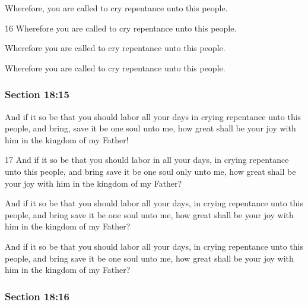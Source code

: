 		Wherefore, you are called to cry repentance unto this people.

		\begin{framed}
		\scriptsize
			\begin{compactdesc}
				\item[JSP] 16 Wherefore you are called to cry repentance unto this people.
				\item[DC 1835] Wherefore you are called to cry repentance unto this people. 
				\item[DC 1844] Wherefore you are called to cry repentance unto this people. 
			\end{compactdesc}
		\end{framed}

	\subsubsection{Section 18:15} %
		\label{DC18-15}

		And if it so be that you should labor all your days in crying repentance unto this people, and bring, save it be one soul unto me, how great shall be your joy with him in the kingdom of my Father!

		\begin{framed}
		\scriptsize
			\begin{compactdesc}
				\item[JSP] 17 And if it so be that you should labor in all your days, in crying repentance unto this people, and bring save it be one soul only unto me, how great shall be your joy with him in the kingdom of my Father?
				\item[DC 1835] And if it so be that you should labor all your days, in crying repentance unto this people, and bring save it be one soul unto me, how great shall be your joy with him in the kingdom of my Father?
				\item[DC 1844] And if it so be that you should labor all your days, in crying repentance unto this people, and bring save it be one soul unto me, how great shall be your joy with him in the kingdom of my Father?
			\end{compactdesc}
		\end{framed}

	\subsubsection{Section 18:16} %
		\label{DC18-16}

